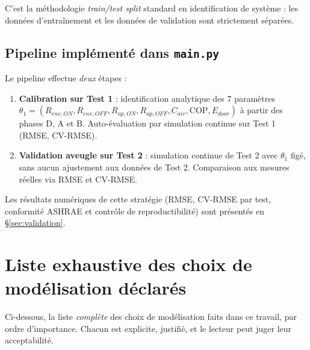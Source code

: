 \documentclass[11pt,a4paper]{article}
\begin{document}
C'est la méthodologie \emph{train/test split} standard en identification de système :
les données d'entraînement et les données de validation sont strictement séparées.

\subsection{Pipeline implémenté dans \texttt{main.py}}

Le pipeline effectue \emph{deux} étapes :
\begin{enumerate}[itemsep=4pt]
\item \textbf{Calibration sur Test 1} : identification analytique des 7 paramètres
$\theta_1 = (R_{env,ON}, R_{env,OFF}, R_{ap,ON}, R_{ap,OFF}, C_{air}, \mathrm{COP},
E_{door})$ à partir des phases D, A et B. Auto-évaluation par simulation continue
sur Test 1 (RMSE, CV-RMSE).
\item \textbf{Validation aveugle sur Test 2} : simulation continue de Test 2 avec
$\theta_1$ figé, sans aucun ajustement aux données de Test 2. Comparaison aux mesures
réelles via RMSE et CV-RMSE.
\end{enumerate}

Les résultats numériques de cette stratégie (RMSE, CV-RMSE par test, conformité ASHRAE
et contrôle de reproductibilité) sont présentés en \S\ref{sec:validation}.

\section{Liste exhaustive des choix de modélisation déclarés}\label{sec:choix_explicites}

Ci-dessous, la liste \emph{complète} des choix de modélisation faits dans ce travail, par
ordre d'importance. Chacun est explicite, justifié, et le lecteur peut juger leur
acceptabilité.
\end{document}
